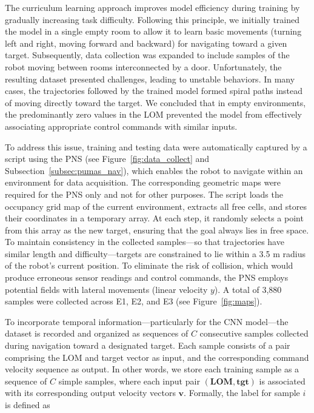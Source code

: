 \documentclass[robotics,article,submit,pdftex,moreauthors]{Definitions/mdpi}
\begin{document}
The curriculum learning approach \citep{DBLP:journals/corr/abs-2101-10382} improves model efficiency during training by gradually increasing task difficulty. Following this principle, we initially trained the model in a single empty room to allow it to learn basic movements (turning left and right, moving forward and backward) for navigating toward a given target. Subsequently, data collection was expanded to include samples of the robot moving between rooms interconnected by a door. Unfortunately, the resulting dataset presented challenges, leading to unstable behaviors. In many cases, the trajectories followed by the trained model formed spiral paths instead of moving directly toward the target. We concluded that in empty environments, the predominantly zero values in the LOM prevented the model from effectively associating appropriate control commands with similar inputs.

To address this issue, training and testing data were automatically captured by a script using the PNS (see Figure~\ref{fig:data_collect} and Subsection~\ref{subsec:pumas_nav}), which enables the robot to navigate within an environment for data acquisition. The corresponding geometric maps were required for the PNS only and not for other purposes. The script loads the occupancy grid map of the current environment, extracts all free cells, and stores their coordinates in a temporary array. At each step, it randomly selects a point from this array as the new target, ensuring that the goal always lies in free space. To maintain consistency in the collected samples—so that trajectories have similar length and difficulty—targets are constrained to lie within a 3.5 m radius of the robot’s current position. To eliminate the risk of collision, which would produce erroneous sensor readings and control commands, the PNS employs potential fields with lateral movements (linear velocity $y$). A total of 3,880 samples were collected across E1, E2, and E3 (see Figure~\ref{fig:maps}).

To incorporate temporal information—particularly for the CNN model—the dataset is recorded and organized as sequences of $C$ consecutive samples collected during navigation toward a designated target. Each sample consists of a pair comprising the LOM and target vector as input, and the corresponding command velocity sequence as output. In other words, we store each training sample as a sequence of $C$ simple samples, where each input pair $(\mathbf{LOM}, \mathbf{tgt})$ is associated with its corresponding output velocity vectors $\mathbf{v}$. Formally, the label for sample $i$ is defined as
\end{document}
